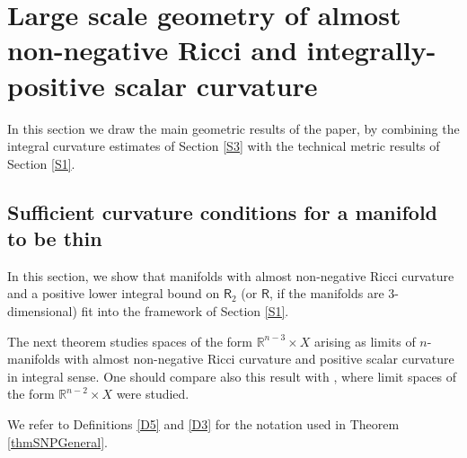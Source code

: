 \documentclass[10pt]{article}
\theoremstyle{definition}
\newcommand{\bb}[1]{\mathbb{#1}}
\newcommand{\R}{\mathsf{R}}
\begin{document}
\section{Large scale geometry of almost non-negative Ricci and integrally-positive scalar curvature}\label{Sec:MainGeom}

In this section we draw the main geometric results of the paper, by combining the integral curvature estimates of Section \ref{S3} with the  technical metric results of Section \ref{S1}. 

\subsection{Sufficient curvature conditions for a manifold to be thin}

In this section, we show that manifolds with almost non-negative Ricci curvature and a positive lower integral bound on $\R_2$ (or $\R$, if the manifolds are $3$-dimensional) fit into the framework of Section \ref{S1}. 

The next theorem studies spaces of the form $\bb{R}^{n-3} \times X$ arising as limits of $n$-manifolds with almost non-negative Ricci curvature and positive scalar curvature in integral sense. One should compare also this result with \cite[Theorem 1.1]{wang2023positive}, where limit spaces of the form $\bb{R}^{n-2} \times X$ were studied. 


We refer to Definitions \ref{D5} and \eqref{D3} for the notation used in Theorem \ref{thmSNPGeneral}.
\end{document}
